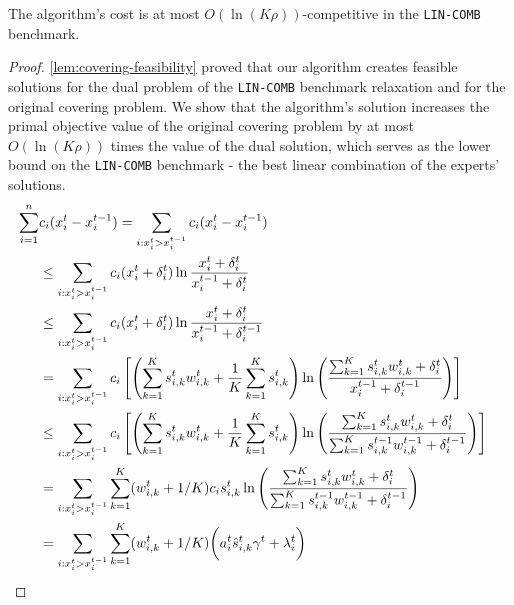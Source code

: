 \begin{theorem} \label{covering-theorem}
The algorithm's cost is at most $O(\ln(K \rho))$-competitive in the \texttt{LIN-COMB} benchmark.
\end{theorem}
%
\begin{proof} \cref{lem:covering-feasibility} proved that our algorithm creates feasible solutions for the dual problem of the \texttt{LIN-COMB} benchmark relaxation and for the original covering problem. We show that the algorithm's solution increases the primal objective value of the original covering problem by at most $O(\ln(K \rho))$ times the value of the dual solution, which serves as the lower bound on the \texttt{LIN-COMB} benchmark - the best linear combination of the experts' solutions.
\begin{align}
	 \sum_{i=1}^{n} &c_{i} (x_{i}^{t} - x_{i}^{t-1})
		= \sum_{i: x_{i}^{t} > x_{i}^{t-1}} c_{i}(x_{i}^{t} - x_{i}^{t-1}) &&  \notag \\
		&\leq \sum_{i: x_{i}^{t} > x_{i}^{t-1}} c_{i}(x_{i}^{t} + \delta_{i}^{t}) \ln \frac{x_{i}^{t} + \delta_{i}^{t}}{x_{i}^{t-1} + \delta_{i}^{t}} \\
		&\leq \sum_{i: x_{i}^{t} > x_{i}^{t-1}} c_{i} (x_{i}^{t} + \delta_{i}^{t}) \ln \frac{x_{i}^{t} + \delta_{i}^{t}}{x_{i}^{t-1} + \delta_{i}^{t-1}} \\
		&= \sum_{i: x_{i}^{t} > x_{i}^{t-1}} c_{i} \left[ \left(\sum_{k=1}^{K}  s_{i,k}^{t} w_{i,k}^{t} + \frac{1}{K} \sum_{k=1}^{K} s_{i,k}^{t} \right)
			\ln \left(\frac{ \sum_{k=1}^{K}  s_{i,k}^{t} w_{i,k}^{t} + \delta_{i}^{t}}{x_{i}^{t-1} + \delta_{i}^{t-1}}  \right) \right] \\
%
&\leq \sum_{i: x_{i}^{t} > x_{i}^{t-1}} c_{i} \left[ \left(\sum_{k=1}^{K}  s_{i,k}^{t} w_{i,k}^{t} + \frac{1}{K} \sum_{k=1}^{K} s_{i,k}^{t} \right)
			\ln \left(\frac{ \sum_{k=1}^{K}  s_{i,k}^{t} w_{i,k}^{t} + \delta_{i}^{t}}{\sum_{k=1}^{K}  s_{i,k}^{t-1} w_{i,k}^{t-1} + \delta_{i}^{t-1}}  \right) \right]\\
%
	&= \sum_{i: x_{i}^{t} > x_{i}^{t-1}} \sum_{k=1}^{K} (w_{i,k}^{t} + 1/K) c_{i} s_{i,k}^{t}
				\ln \left(\frac{ \sum_{k=1}^{K} s_{i,k}^{t} w_{i,k}^{t}  + \delta_{i}^{t}}{\sum_{k=1}^{K}  s_{i,k}^{t-1} w_{i,k}^{t-1}  + \delta_{i}^{t-1}}  \right) \notag \\
%
%
&=  \sum_{i: x_{i}^{t} > x_{i}^{t-1}} \sum_{k=1}^{K} (w_{i,k}^{t} + 1/K) \biggl( a_{i}^{t} \hat{s}_{i,k}^{t} \gamma^t + \lambda_{i}^{t} \biggr) \\

\end{align}
\end{proof}
